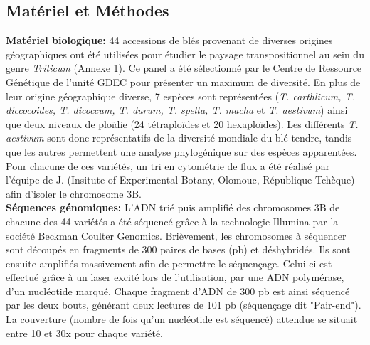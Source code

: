\documentclass[a4paper, 12pt]{article}
\begin{document}
\begin{onehalfspace}
\part{Matériel et Méthodes}
\textbf{Matériel biologique:} 44 accessions de blés provenant de diverses origines géographiques ont été utilisées pour étudier le paysage transpositionnel au sein du genre \textit{Triticum} (Annexe 1). Ce panel a été sélectionné par le Centre de Ressource Génétique de l'unité GDEC pour présenter un maximum de diversité. En plus de leur origine géographique diverse, 7 espèces sont représentées (\textit{T. carthlicum, T. diccocoides, T. dicoccum, T. durum, T. spelta, T. macha} et \textit{T. aestivum}) ainsi que deux niveaux de ploïdie (24 tétraploïdes et 20 hexaploïdes). Les différents \textit{T. aestivum} sont donc représentatifs de la diversité mondiale du blé tendre, tandis que les autres permettent une analyse phylogénique sur des espèces apparentées. Pour chacune de ces variétés, un tri en cytométrie de flux a été réalisé par l'équipe de J.  (Insitute of Experimental Botany, Olomouc, République Tchèque) afin d'isoler le chromosome 3B.\\

\textbf{Séquences génomiques:} L'ADN trié puis amplifié des chromosomes 3B de chacune des 44 variétés a été séquencé grâce à la technologie Illumina par la société Beckman Coulter Genomics. Brièvement, les chromosomes à séquencer sont découpés en fragments de 300 paires de bases (pb) et déshybridés. Ils sont ensuite amplifiés massivement afin de permettre le séquençage. Celui-ci est effectué grâce à un laser excité lors de l'utilisation, par une ADN polymérase, d'un nucléotide marqué. Chaque fragment d'ADN de 300 pb est ainsi séquencé par les deux bouts, générant deux lectures de 101 pb (séquençage dit "Pair-end"). La couverture (nombre de fois qu'un nucléotide est séquencé) attendue se situait entre 10 et 30x pour chaque variété.\\


\end{onehalfspace}
\end{document}
